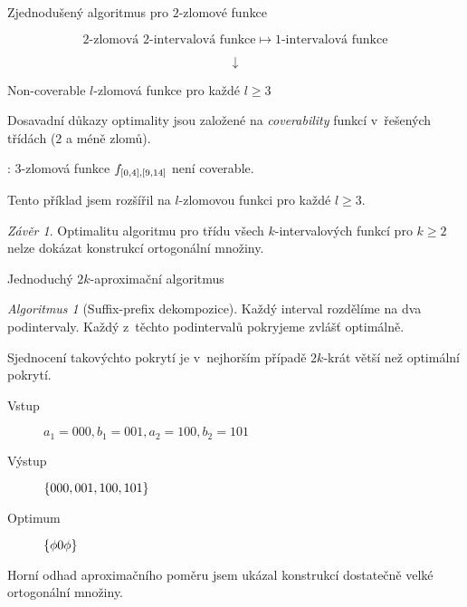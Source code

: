 \documentclass{beamer}
\theoremstyle{remark}
\newtheorem{algorithm}{Algoritmus}
\newtheorem{conclusion}{Závěr}
\newcommand{\downmapsto}{\downarrow}
\begin{document}
\begin{frame}{Zjednodušený algoritmus pro $2$-zlomové funkce}

$$
\text{$2$-zlomová $2$-intervalová funkce}
\mapsto \text{$1$-intervalová funkce}
$$

\begin{example}
\begin{figure}[h]
\centering

\end{figure}
$$
\downmapsto
$$
\begin{figure}[h]
\centering

\end{figure}
\end{example}

\end{frame}

\begin{frame}{Non-coverable $l$-zlomová funkce pro každé $l \geq 3$}

Dosavadní důkazy optimality jsou založené na \emph{coverability} funkcí v~řešených třídách ($2$ a méně zlomů).

\citet{Dubovsky2012}: $3$-zlomová funkce $f_{[0, 4], [9, 14]}$ není coverable.

Tento příklad jsem rozšířil na $l$-zlomovou funkci pro každé $l \geq 3$.

\begin{conclusion}
Optimalitu algoritmu pro třídu všech $k$-intervalových funkcí pro $k \geq 2$ nelze dokázat konstrukcí ortogonální množiny.
\end{conclusion}
\end{frame}

\begin{frame}{Jednoduchý $2k$-aproximační algoritmus}
\begin{algorithm}[Suffix-prefix dekompozice]
Každý interval rozdělíme na dva  podintervaly.
Každý z~těchto podintervalů pokryjeme zvlášť optimálně.
\end{algorithm}

Sjednocení takovýchto pokrytí je v~nejhorším případě $2k$-krát větší než optimální pokrytí.

\begin{example}
\begin{description}
\item[Vstup]
$a_1 = 000, b_1 = 001, a_2 = 100, b_2 = 101$

\item[Výstup]
$\{000, 001, 100, 101\}$

\item[Optimum]
$\{\phi 0 \phi\}$
\end{description}
\end{example}

Horní odhad aproximačního poměru jsem ukázal konstrukcí dostatečně velké ortogonální množiny.
\end{frame}
\end{document}
